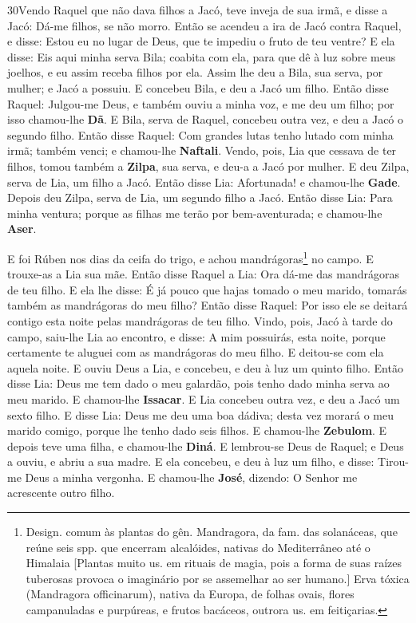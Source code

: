 \lettrine{30} Vendo Raquel que não dava filhos a Jacó, teve
inveja de sua irmã, e disse a Jacó: Dá-me filhos, se não morro.
Então se acendeu a ira de Jacó contra Raquel, e disse: Estou eu
no lugar de Deus, que te impediu o fruto de teu ventre? E ela
disse: Eis aqui minha serva Bila; coabita com ela, para que dê à luz
sobre meus joelhos, e eu assim receba filhos por ela. Assim lhe
deu a Bila, sua serva, por mulher; e Jacó a possuiu. E concebeu
Bila, e deu a Jacó um filho. Então disse Raquel: Julgou-me Deus,
e também ouviu a minha voz, e me deu um filho; por isso chamou-lhe
\textbf{Dã}. E Bila, serva de Raquel, concebeu outra vez, e deu
a Jacó o segundo filho. Então disse Raquel: Com grandes lutas
tenho lutado com minha irmã; também venci; e chamou-lhe
\textbf{Naftali}. Vendo, pois, Lia que cessava de ter filhos,
tomou também a \textbf{Zilpa}, sua serva, e deu-a a Jacó por mulher.
E deu Zilpa, serva de Lia, um filho a Jacó. Então
disse Lia: Afortunada! e chamou-lhe \textbf{Gade}. Depois deu
Zilpa, serva de Lia, um segundo filho a Jacó. Então disse
Lia: Para minha ventura; porque as filhas me terão por
bem-aventurada; e chamou-lhe \textbf{Aser}.

E foi Rúben nos dias da ceifa do trigo, e achou
mandrágoras\footnote{Design. comum às plantas do gên. Mandragora, da
fam. das solanáceas, que reúne seis spp. que encerram alcalóides,
nativas do Mediterrâneo até o Himalaia [Plantas muito us. em rituais
de magia, pois a forma de suas raízes tuberosas provoca o imaginário
por se assemelhar ao ser humano.] Erva tóxica (Mandragora
officinarum), nativa da Europa, de folhas ovais, flores campanuladas
e purpúreas, e frutos bacáceos, outrora us. em feitiçarias.} no
campo. E trouxe-as a Lia sua mãe. Então disse Raquel a Lia: Ora
dá-me das mandrágoras de teu filho. E ela lhe disse: É já
pouco que hajas tomado o meu marido, tomarás também as mandrágoras
do meu filho? Então disse Raquel: Por isso ele se deitará contigo
esta noite pelas mandrágoras de teu filho. Vindo, pois, Jacó
à tarde do campo, saiu-lhe Lia ao encontro, e disse: A mim
possuirás, esta noite, porque certamente te aluguei com as
mandrágoras do meu filho. E deitou-se com ela aquela noite. E
ouviu Deus a Lia, e concebeu, e deu à luz um quinto filho.
Então disse Lia: Deus me tem dado o meu galardão, pois tenho
dado minha serva ao meu marido. E chamou-lhe \textbf{Issacar}.
E Lia concebeu outra vez, e deu a Jacó um sexto filho.
E disse Lia: Deus me deu uma boa dádiva; desta vez morará o
meu marido comigo, porque lhe tenho dado seis filhos. E chamou-lhe
\textbf{Zebulom}. E depois teve uma filha, e chamou-lhe
\textbf{Diná}. E lembrou-se Deus de Raquel; e Deus a ouviu, e
abriu a sua madre. E ela concebeu, e deu à luz um filho, e
disse: Tirou-me Deus a minha vergonha. E chamou-lhe
\textbf{José}, dizendo: O Senhor me acrescente outro filho.

